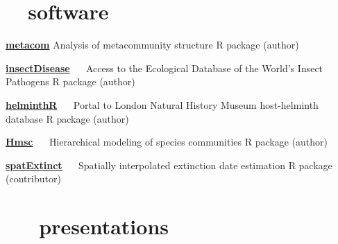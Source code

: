\documentclass[]{CV}
\begin{document}
\section{\faCode \ \  software}
\begin{entrylist}
 \entry
 {\href{http://cran.r-project.org/web/packages/metacom/}{\textbf{metacom}}}
 {Analysis of metacommunity structure} 
 {R package (author)}

 \entry
 {\href{https://github.com/viralemergence/insectDisease}{\textbf{insectDisease}} \ \ }
 {Access to the Ecological Database of the World's Insect Pathogens}
 {R package (author)}


 \entry
 {\href{https://cran.r-project.org/web/packages/helminthR/index.html}{\textbf{helminthR}} \ \ }
 {Portal to London Natural History Museum host-helminth database}
 {R package (author)}

 \entry
 {\href{https://cran.r-project.org/web/packages/Hmsc/index.html}{\textbf{Hmsc}} \ \ }
 {Hierarchical modeling of species communities}
 {R package (author)}

 \entry
 {\href{http://github.com/cjcarlson/spatExtinct}{\textbf{spatExtinct}} \ \ }
 {Spatially interpolated extinction date estimation}
 {R package (contributor)}

\end{entrylist}





\section{\faVideoCamera \ \ \ presentations}
\end{document}
